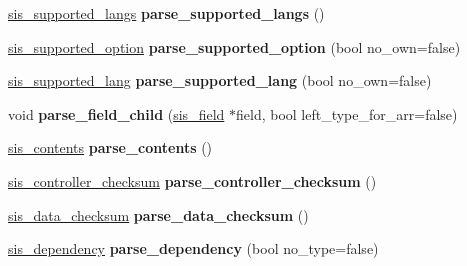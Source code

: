 \begin{DoxyCompactItemize}
\mbox{\hyperlink{structeka2l1_1_1loader_1_1sis__supported__langs}{sis\+\_\+supported\+\_\+langs}} {\bfseries parse\+\_\+supported\+\_\+langs} ()
\item 
\mbox{\label{classeka2l1_1_1loader_1_1sis__parser_a6390fa6353d6eb0720456321a5c36c5b}} 
\mbox{\hyperlink{structeka2l1_1_1loader_1_1sis__supported__option}{sis\+\_\+supported\+\_\+option}} {\bfseries parse\+\_\+supported\+\_\+option} (bool no\+\_\+own=false)
\item 
\mbox{\label{classeka2l1_1_1loader_1_1sis__parser_a112d50f4c16f32e5fba1a15a01a932f4}} 
\mbox{\hyperlink{structeka2l1_1_1loader_1_1sis__supported__lang}{sis\+\_\+supported\+\_\+lang}} {\bfseries parse\+\_\+supported\+\_\+lang} (bool no\+\_\+own=false)
\item 
\mbox{\label{classeka2l1_1_1loader_1_1sis__parser_a69422e2a9edae8a00acfd171c13eb0b2}} 
void {\bfseries parse\+\_\+field\+\_\+child} (\mbox{\hyperlink{structeka2l1_1_1loader_1_1sis__field}{sis\+\_\+field}} $\ast$field, bool left\+\_\+type\+\_\+for\+\_\+arr=false)
\item 
\mbox{\label{classeka2l1_1_1loader_1_1sis__parser_abc2039782607889795eefb5cbfffabce}} 
\mbox{\hyperlink{structeka2l1_1_1loader_1_1sis__contents}{sis\+\_\+contents}} {\bfseries parse\+\_\+contents} ()
\item 
\mbox{\label{classeka2l1_1_1loader_1_1sis__parser_a14dc5f782a83f0da9fad9ee233145404}} 
\mbox{\hyperlink{structeka2l1_1_1loader_1_1sis__controller__checksum}{sis\+\_\+controller\+\_\+checksum}} {\bfseries parse\+\_\+controller\+\_\+checksum} ()
\item 
\mbox{\label{classeka2l1_1_1loader_1_1sis__parser_adc08302f54594a869059af8152e16088}} 
\mbox{\hyperlink{structeka2l1_1_1loader_1_1sis__data__checksum}{sis\+\_\+data\+\_\+checksum}} {\bfseries parse\+\_\+data\+\_\+checksum} ()
\item 
\mbox{\label{classeka2l1_1_1loader_1_1sis__parser_a435cf299825d7abe59fc3cb5b4b1a5cd}} 
\mbox{\hyperlink{structeka2l1_1_1loader_1_1sis__dependency}{sis\+\_\+dependency}} {\bfseries parse\+\_\+dependency} (bool no\+\_\+type=false)

\end{DoxyCompactItemize}
